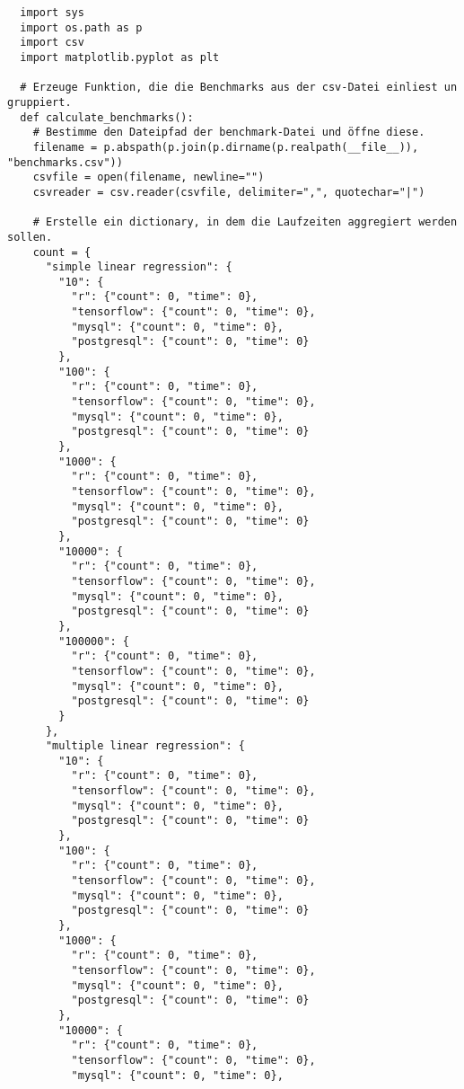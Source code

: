 \begin{verbatim}
  import sys
  import os.path as p
  import csv
  import matplotlib.pyplot as plt

  # Erzeuge Funktion, die die Benchmarks aus der csv-Datei einliest un gruppiert.
  def calculate_benchmarks():
    # Bestimme den Dateipfad der benchmark-Datei und öffne diese.
    filename = p.abspath(p.join(p.dirname(p.realpath(__file__)), "benchmarks.csv"))
    csvfile = open(filename, newline="")
    csvreader = csv.reader(csvfile, delimiter=",", quotechar="|")

    # Erstelle ein dictionary, in dem die Laufzeiten aggregiert werden sollen.
    count = {
      "simple linear regression": {
        "10": {
          "r": {"count": 0, "time": 0},
          "tensorflow": {"count": 0, "time": 0},
          "mysql": {"count": 0, "time": 0},
          "postgresql": {"count": 0, "time": 0}
        },
        "100": {
          "r": {"count": 0, "time": 0},
          "tensorflow": {"count": 0, "time": 0},
          "mysql": {"count": 0, "time": 0},
          "postgresql": {"count": 0, "time": 0}
        },
        "1000": {
          "r": {"count": 0, "time": 0},
          "tensorflow": {"count": 0, "time": 0},
          "mysql": {"count": 0, "time": 0},
          "postgresql": {"count": 0, "time": 0}
        },
        "10000": {
          "r": {"count": 0, "time": 0},
          "tensorflow": {"count": 0, "time": 0},
          "mysql": {"count": 0, "time": 0},
          "postgresql": {"count": 0, "time": 0}
        },
        "100000": {
          "r": {"count": 0, "time": 0},
          "tensorflow": {"count": 0, "time": 0},
          "mysql": {"count": 0, "time": 0},
          "postgresql": {"count": 0, "time": 0}
        }
      },
      "multiple linear regression": {
        "10": {
          "r": {"count": 0, "time": 0},
          "tensorflow": {"count": 0, "time": 0},
          "mysql": {"count": 0, "time": 0},
          "postgresql": {"count": 0, "time": 0}
        },
        "100": {
          "r": {"count": 0, "time": 0},
          "tensorflow": {"count": 0, "time": 0},
          "mysql": {"count": 0, "time": 0},
          "postgresql": {"count": 0, "time": 0}
        },
        "1000": {
          "r": {"count": 0, "time": 0},
          "tensorflow": {"count": 0, "time": 0},
          "mysql": {"count": 0, "time": 0},
          "postgresql": {"count": 0, "time": 0}
        },
        "10000": {
          "r": {"count": 0, "time": 0},
          "tensorflow": {"count": 0, "time": 0},
          "mysql": {"count": 0, "time": 0},

\end{verbatim}

